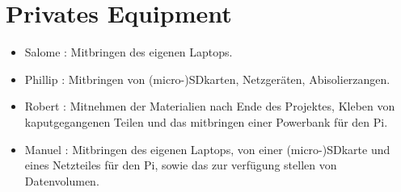 \documentclass{article}
\begin{document}
\section{Privates Equipment}

\begin{itemize}

\item Salome : Mitbringen des eigenen Laptops.

\item Phillip : Mitbringen von (micro-)SDkarten, Netzger\"{a}ten, Abisolierzangen.

\item Robert : Mitnehmen der Materialien nach Ende des Projektes, Kleben von kaputgegangenen Teilen und das mitbringen einer Powerbank f\"{u}r den Pi. 

\item Manuel : Mitbringen des eigenen Laptops, von einer (micro-)SDkarte und eines Netzteiles f\"{u}r den Pi, sowie das zur verf\"{u}gung stellen von Datenvolumen.

\end{itemize}
\end{document}
